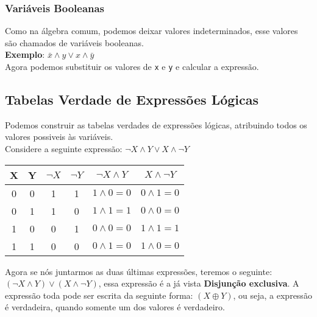 \documentclass[12pt, onecolumn]{article}
\begin{document}
		\subsubsection{\centering Variáveis Booleanas}
	
	Como na álgebra comum, podemos deixar valores indeterminados, esse valores
	são chamados de variáveis booleanas.\\
	\newline
	\textbf{Exemplo}: $\bar{x} \land y \lor x \land \bar{y}$ \\
	Agora podemos substituir os valores de \texttt{x} e \texttt{y} e calcular
	a expressão. \\
		
		\subsection{\centering Tabelas Verdade de Expressões Lógicas}

	Podemos construir as tabelas verdades de expressões lógicas, atribuindo
	todos os valores possiveis às variáveis.\\
	\newline
	Considere a seguinte expressão: $\lnot{X} \land Y \lor X \land \lnot{Y}$ \\
	\begin{table}[ht]
		\centering
		\begin{tabular}{|c|c|c|c|c|c|}
			\hline
			X & Y & $\lnot{X}$ & $\lnot{Y}$ & $\lnot X \land Y$
			& $X\land \lnot Y$ \\ \hline

			0 & 0 & 1 & 1 & $1 \land 0 = 0$ & $0 \land 1 = 0$ \\
			0 & 1 & 1 & 0 & $1 \land 1 = 1$ & $0 \land 0 = 0$ \\
			1 & 0 & 0 & 1 & $0 \land 0 = 0$ & $1 \land 1 = 1$ \\
			1 & 1 & 0 & 0 & $0 \land 1 = 0$ & $1 \land 0 = 0$ \\
			\hline
		\end{tabular}
	\end{table}

	Agora se nós juntarmos as duas últimas expressões, teremos o seguinte:\\
	\newline
	$(\lnot X \land Y) \lor (X \land \lnot Y)$, essa expressão é a já vista
	\textbf{Disjunção exclusiva}. A expressão toda pode ser escrita da seguinte 
	forma: $(X \oplus Y)$, ou seja, a expressão é verdadeira, quando somente um 
	dos valores é verdadeiro.
\end{document}
